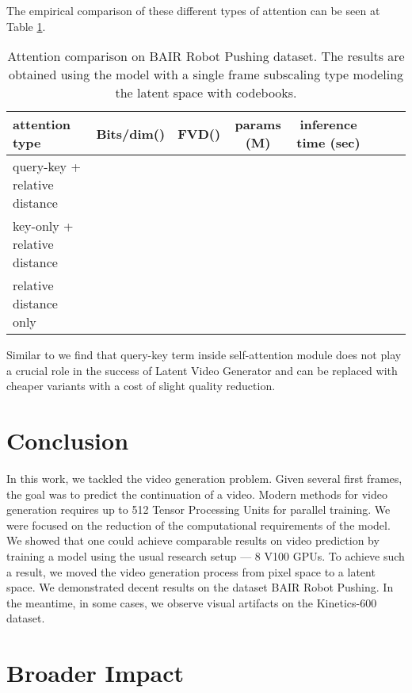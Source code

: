 \documentclass{article}
\begin{document}
The empirical comparison of these different types of attention can be seen at Table \ref{table:attention}.

\begin{table}[!hbtp]
\centering
\caption{Attention comparison on BAIR Robot Pushing dataset. The results are obtained using the model with a single frame subscaling type modeling the latent space with  codebooks.}
\begin{tabular}{lllccccc}
\hline
\textbf{attention type} & \textbf{Bits/dim}() & \textbf{FVD}() & \textbf{params (M)} & \textbf{inference time (sec)} \\ \hline
query-key + relative distance                    &               &  &  &   \\
key-only + relative distance                   &               &   &  & \\
relative distance only                    &               &   &  & \\ \hline
\end{tabular}
\label{table:attention}
\end{table}

Similar to \cite{zhu2019empirical} we find that query-key term inside self-attention module does not play a crucial role in the success of Latent Video Generator and can be replaced with cheaper variants with a cost of slight quality reduction.





%
 \section{Conclusion}

In this work, we tackled the video generation problem. Given several first frames, the goal was to predict the continuation of a video. Modern methods for video generation requires up to 512 Tensor Processing Units for parallel training. We were focused on the reduction of the computational requirements of the model. We showed that one could achieve comparable results on video prediction by training a model using the usual research setup --- 8 V100 GPUs. To achieve such a result, we moved the video generation process from pixel space to a latent space. We demonstrated decent results on the dataset BAIR Robot Pushing. In the meantime, in some cases, we observe visual artifacts on the Kinetics-600 dataset. \section*{Broader Impact}
\end{document}
